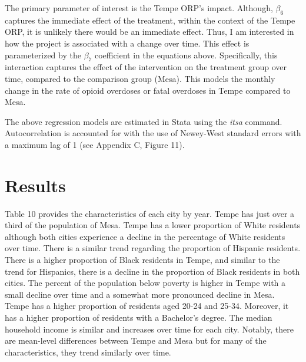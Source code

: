 The primary parameter of interest is the Tempe ORP's impact. Although, \(\beta_6\) captures the immediate effect of the treatment, within the context of the Tempe ORP, it is unlikely there would be an immediate effect. Thus, I am interested in how the project is associated with a change over time. This effect is parameterized by the \(\beta_7\) coefficient in the equations above. Specifically, this interaction captures the effect of the intervention on the treatment group over time, compared to the comparison group (Mesa). This models the monthly change in the rate of opioid overdoses or fatal overdoses in Tempe compared to Mesa. 

The above regression models are estimated in Stata \parencite{statacorp_stata_2023} using the \textit{itsa} command. Autocorrelation is accounted for with the use of Newey-West standard errors with a maximum lag of 1 (see Appendix C, Figure 11).

\section{\centering Results}
Table 10 provides the characteristics of each city by year. Tempe has just over a third of the population of Mesa. Tempe has a lower proportion of White residents although both cities experience a decline in the percentage of White residents over time. There is a similar trend regarding the proportion of Hispanic residents. There is a higher proportion of Black residents in Tempe, and similar to the trend for Hispanics, there is a decline in the proportion of Black residents in both cities. The percent of the population below poverty is higher in Tempe with a small decline over time and a somewhat more pronounced decline in Mesa. Tempe has a higher proportion of residents aged 20-24 and 25-34. Moreover, it has a higher proportion of residents with a Bachelor's degree. The median household income is similar and increases over time for each city. Notably, there are mean-level differences between Tempe and Mesa but for many of the characteristics, they trend similarly over time. 

